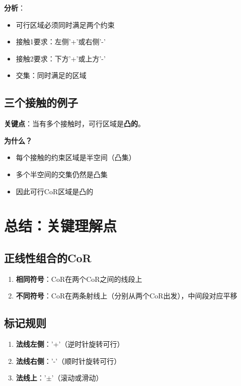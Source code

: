 \documentclass[12pt,a4paper]{article}
\begin{document}
\textbf{分析}：
\begin{itemize}
\item 可行区域必须同时满足两个约束
\item 接触1要求：左侧'+'或右侧'-'
\item 接触2要求：下方'+'或上方'-'
\item 交集：同时满足的区域
\end{itemize}

\subsection{三个接触的例子}

\textbf{关键点}：当有多个接触时，可行区域是\textbf{凸的}。

\textbf{为什么？}
\begin{itemize}
\item 每个接触的约束区域是半空间（凸集）
\item 多个半空间的交集仍然是凸集
\item 因此可行CoR区域是凸的
\end{itemize}

\section{总结：关键理解点}

\subsection{正线性组合的CoR}

\begin{enumerate}
\item \textbf{相同符号}：CoR在两个CoR之间的线段上
\item \textbf{不同符号}：CoR在两条射线上（分别从两个CoR出发），中间段对应平移
\end{enumerate}

\subsection{标记规则}

\begin{enumerate}
\item \textbf{法线左侧}：'+'（逆时针旋转可行）
\item \textbf{法线右侧}：'-'（顺时针旋转可行）
\item \textbf{法线上}：'$\pm$'（滚动或滑动）
\end{enumerate}
\end{document}
